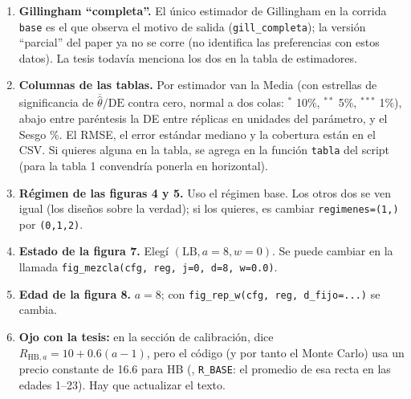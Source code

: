 \documentclass{article}
\newcommand{\archivo}[1]{\path{#1}}
\begin{document}
\begin{enumerate}
\item \textbf{Gillingham ``completa''.} El único estimador de Gillingham en la corrida \texttt{base} es
  el que observa el motivo de salida (\texttt{gill\_completa}); la versión ``parcial'' del paper ya no se
  corre (no identifica las preferencias con estos datos). La tesis todavía menciona los dos en la tabla
  de estimadores.
\item \textbf{Columnas de las tablas.} Por estimador van la Media (con estrellas de significancia de
  $\overline{\hat\theta}/\text{DE}$ contra cero, normal a dos colas: $^{*}$ 10\%, $^{**}$ 5\%, $^{***}$ 1\%),
  abajo entre paréntesis la DE entre réplicas en unidades del parámetro, y el Sesgo \%. El RMSE,
  el error estándar mediano y la cobertura están en el CSV. Si quieres alguna en la tabla, se agrega en
  la función \texttt{tabla} del script (para la tabla 1 convendría ponerla en horizontal).
\item \textbf{Régimen de las figuras 4 y 5.} Uso el régimen base. Los otros dos se ven igual (los diseños
  sobre la verdad); si los quieres, es cambiar \texttt{regimenes=(1,)} por \texttt{(0,1,2)}.
\item \textbf{Estado de la figura 7.} Elegí $(\text{LB}, a=8, w=0)$. Se puede cambiar en la llamada
  \texttt{fig\_mezcla(cfg, reg, j=0, d=8, w=0.0)}.
\item \textbf{Edad de la figura 8.} $a=8$; con \texttt{fig\_rep\_w(cfg, reg, d\_fijo=...)} se cambia.
\item \textbf{Ojo con la tesis:} en la sección de calibración, \archivo{tesis.tex} dice
  $R_{\text{HB},a}=10+0.6(a-1)$, pero el código (y por tanto el Monte Carlo) usa un precio constante de
  16.6 para HB (\archivo{params.py}, \texttt{R\_BASE}: el promedio de esa recta en las edades 1--23).
  Hay que actualizar el texto.
\end{enumerate}
\end{document}
